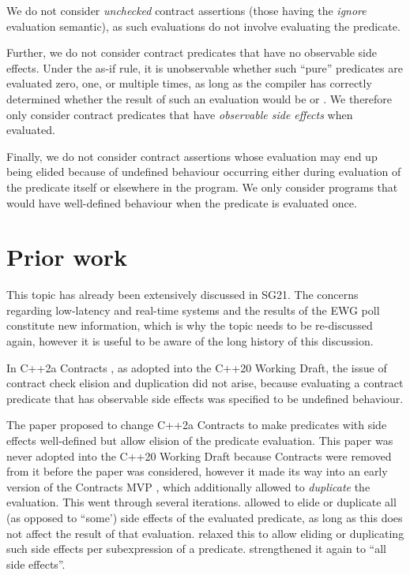 We do not consider \emph{unchecked} contract assertions (those having the \emph{ignore} evaluation semantic), as such evaluations do not involve evaluating the predicate.

Further, we do not consider contract predicates that have no observable side effects. Under the as-if rule, it is unobservable whether such ``pure'' predicates are evaluated zero, one, or multiple times, as long as the compiler has correctly determined whether the result of such an evaluation would be  or . We therefore only consider contract predicates that have \emph{observable side effects} when evaluated.

Finally, we do not consider contract assertions whose evaluation may end up being elided because of undefined behaviour occurring either during evaluation of the predicate itself or elsewhere in the program. We only consider programs that would have well-defined behaviour when the predicate is evaluated once.



\section{Prior work}

This topic has already been extensively discussed in SG21. The concerns regarding low-latency and real-time systems and the results of the EWG poll constitute new information, which is why the topic needs to be re-discussed again, however it is useful to be aware of the long history of this discussion.

In C++2a Contracts \cite{P0542R5}, as adopted into the C++20 Working Draft, the issue of contract check elision and duplication did not arise, because evaluating a contract predicate that has observable side effects was specified to be undefined behaviour.

The paper \cite{P1670R0} proposed to change C++2a Contracts to make predicates with side effects well-defined but allow elision of the predicate evaluation. This paper was never adopted into the C++20 Working Draft because Contracts were removed from it before the paper was considered, however it made its way into an early version of the Contracts MVP \cite{P2388R4}, which additionally allowed to \emph{duplicate} the evaluation. This went through several iterations. \cite{P2388R0} allowed to elide or duplicate all (as opposed to ``some') side effects of the evaluated predicate, as long as this does not affect the result of that evaluation. \cite{P2388R3} relaxed this to allow eliding or duplicating such side effects per subexpression of a predicate. \cite{P2521R5} strengthened it again to ``all side effects''.


